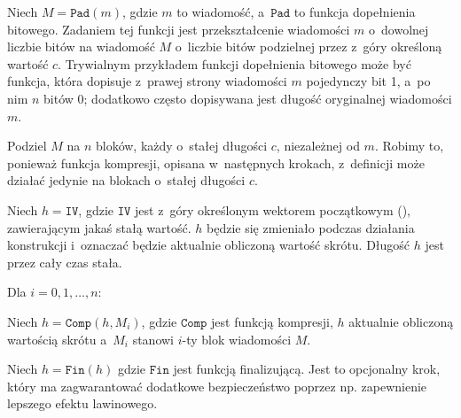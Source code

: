 \begin{myenumerate}

    \item Niech $M = \mathtt{Pad}(m)$, gdzie $m$ to wiadomość, a~$\mathtt{Pad}$
    to funkcja dopełnienia bitowego. Zadaniem tej funkcji jest przekształcenie
    wiadomości $m$ o~dowolnej liczbie bitów na wiadomość $M$ o~liczbie bitów
    podzielnej przez z~góry określoną wartość $c$. Trywialnym przykładem
    funkcji dopełnienia bitowego może być funkcja, która dopisuje z~prawej
    strony wiadomości $m$ pojedynczy bit 1, a~po nim $n$ bitów 0; dodatkowo
    często dopisywana jest długość oryginalnej wiadomości $m$.

    \item Podziel $M$ na $n$ bloków, każdy o~stałej długości $c$, niezależnej
    od $m$. Robimy to, ponieważ funkcja kompresji, opisana w~następnych
    krokach, z~definicji może działać jedynie na blokach o~stałej długości $c$.

    \item Niech $h = \mathtt{IV}$, gdzie $\mathtt{IV}$ jest z~góry określonym
    wektorem początkowym (), zawierającym jakaś stałą
    wartość. $h$ będzie się zmieniało podczas działania konstrukcji i~oznaczać
    będzie aktualnie obliczoną wartość skrótu. Długość $h$ jest przez cały czas
    stała.

    \item Dla $i = 0, 1, \ldots, n$:

    \begin{myenumerate}

        \item Niech $h=\mathtt{Comp}(h,M_i)$, gdzie $\mathtt{Comp}$ jest
        funkcją kompresji, $h$ aktualnie obliczoną wartością skrótu a~$M_i$
        stanowi $i$-ty blok wiadomości $M$.

    \end{myenumerate}

    \item Niech $h=\mathtt{Fin}(h)$ gdzie $\mathtt{Fin}$ jest funkcją
    finalizującą. Jest to opcjonalny krok, który ma zagwarantować dodatkowe
    bezpieczeństwo poprzez np. zapewnienie lepszego efektu lawinowego.

\end{myenumerate}

